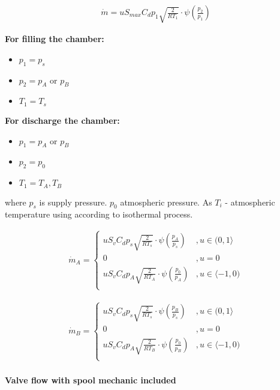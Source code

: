 \begin{align}
    \dot{m} = u S_{max} C_d p_1 \sqrt{\frac{2}{RT_1}}
    \cdot \psi\left(\frac{p_2}{p_1}\right)
    \label{eq:flow}
\end{align}

\textbf{For filling the chamber:}
\begin{itemize}
\item $p_1 = p_s$ 
\item $p_2 = p_A \text{ or } p_B$
\item $T_1 = T_s$
\end{itemize}

\textbf{For discharge the chamber:}
\begin{itemize}
\item $p_1 = p_A \text{ or } p_B$
\item $p_2 = p_0$
\item $T_1 = T_A, T_B$
\end{itemize}

where $p_s$ is supply pressure. $p_0$ atmospheric pressure. As $T_i$ - 
atmospheric temperature using according to isothermal process.

\begin{align}
    \dot{m}_A =
    \begin{cases}
        u S_v C_d p_s \sqrt{\frac{2}{RT_s}}
        \cdot \psi\left(\frac{p_A}{p_s}\right)  &,   u \in (0, 1 \rangle \\
        0   &,  u = 0 \\
        u S_v C_d p_A \sqrt{\frac{2}{RT_A}}
        \cdot \psi\left(\frac{p_0}{p_A}\right)  &,   u \in \langle -1, 0) \\
    \end{cases}
\end{align}

\begin{align}
    \dot{m}_B =
    \begin{cases}
        u S_v C_d p_s \sqrt{\frac{2}{RT_s}}
        \cdot \psi\left(\frac{p_B}{p_s}\right)  &,   u \in (0, 1 \rangle \\
        0   &,  u = 0 \\
        u S_v C_d p_A \sqrt{\frac{2}{RT_B}}
        \cdot \psi\left(\frac{p_0}{p_B}\right)  &,   u \in \langle -1, 0) \\
    \end{cases}
\end{align}

\paragraph{Valve flow with spool mechanic included}

